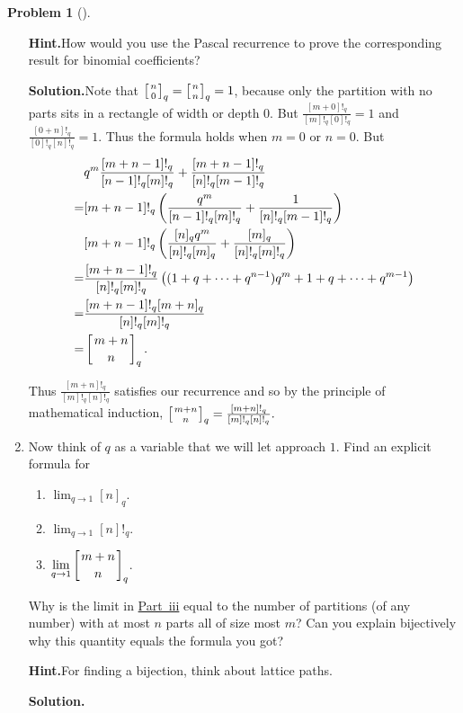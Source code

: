 \documentclass[10pt,]{book}
\theoremstyle{plain}
\theoremstyle{definition}
\newtheorem{activity}[project]{Problem}
\theoremstyle{definition}
\numberwithin{equation}{chapter}
\newcommand{\qchoose}[2]{\left[{#1\atop#2}\right]_q}
\newcommand{\amp}{&}
\begin{document}
\begin{activity}[]
\begin{enumerate}[font=\bfseries,label=(\alph*),ref=\alph*]
%
\par\medskip\noindent%
\textbf{Hint.}\quad How would you use the Pascal recurrence to prove the corresponding result for binomial coefficients?%
\par\medskip\noindent%
\textbf{Solution.}\quad Note that \(\qchoose{n}{0}= \qchoose{n}{n} = 1\), because only the partition with no parts sits in a rectangle of width or depth 0. But \(\frac{[m+0]!_q}{[m]!_q[0]!_q} =1\) and \(\frac{[0+n]!_q}{[0]!_q[n]!_q} =1\). Thus the formula holds when \(m=0\) or \(n=0\). But%
\begin{align*}
\amp q^m\frac{[m+n-1]!_q}{[n-1]!_q[m]!_q}+\frac{[m+n-1]!_q}{[n]!_q[m-1]!_q}\\
=\amp \relax[m+n-1]!_q\left(\frac{q^m}{[n-1]!_q[m]!_q}
+\frac{1}{[n]!_q[m-1]!_q}\right)\\
\amp \relax[m+n-1]!_q\left(\frac{[n]_qq^m}{[n]!_q[m]_q}+\frac{[m]_q}{[n]!_q[m]!_q}\right)\\
=\amp \relax\frac{[m+n-1]!_q}{[n]!_q[m]!_q}\left((1+q+\cdots+q^{n-1})q^m +
1+q+\cdots+q^{m-1}\right)\\
=\amp \relax\frac{[m+n-1]!_q[m+n]_q}{[n]!_q[m]!_q}\\
=\amp \qchoose{m+n}{n}.
\end{align*}
%
\par
Thus \(\frac{[m+n]!_q}{[m]!_q[n]!_q}\) satisfies our recurrence and so by the principle of mathematical induction, \(\qchoose{m+n}{n} = \frac{[m+n]!_q}{[m]!_q[n]!_q}.\)%
\item\label{task-151} Now think of \(q\) as a variable that we will let approach \(1\). Find an explicit formula for \leavevmode%
\begin{enumerate}[label=(\roman*)]
\item\hypertarget{li-74}{}\(\displaystyle\lim_{q\rightarrow 1} [n]_q\).%
\item\hypertarget{li-75}{}\(\displaystyle\lim_{q\rightarrow 1} [n]!_q\).%
\item\hypertarget{q-binomial-lim}{}\(\displaystyle\lim_{q\rightarrow 1} \qchoose{m+n}{n}\).%
\end{enumerate}
 Why is the limit in \hyperlink{q-binomial-lim}{Part~iii} equal to the number of partitions (of any number) with at most \(n\) parts all of size most \(m\)? Can you explain bijectively why this quantity equals the formula you got?%
\par\medskip\noindent%
\textbf{Hint.}\quad For finding a bijection, think about lattice paths.%
\par\medskip\noindent%
\textbf{Solution.}\quad \leavevmode%

\end{enumerate}
\end{activity}
\end{document}
